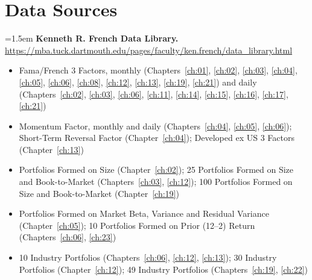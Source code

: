 \chapter*{Data Sources}
\label{datasources}


\begingroup
\small
\sloppy
\setlength{\parindent}{0pt}
\setlength{\parskip}{4pt}

\hangindent=1.5em \textbf{Kenneth R. French Data Library.} \url{https://mba.tuck.dartmouth.edu/pages/faculty/ken.french/data_library.html}
\begin{itemize}\setlength{\itemsep}{0pt}\setlength{\parskip}{0pt}
  \item Fama/French 3 Factors, monthly (Chapters~\ref{ch:01}, \ref{ch:02}, \ref{ch:03}, \ref{ch:04}, \ref{ch:05}, \ref{ch:06}, \ref{ch:08}, \ref{ch:12}, \ref{ch:13}, \ref{ch:19}, \ref{ch:21}) and daily (Chapters~\ref{ch:02}, \ref{ch:03}, \ref{ch:06}, \ref{ch:11}, \ref{ch:14}, \ref{ch:15}, \ref{ch:16}, \ref{ch:17}, \ref{ch:21})
  \item Momentum Factor, monthly and daily (Chapters~\ref{ch:04}, \ref{ch:05}, \ref{ch:06}); Short-Term Reversal Factor (Chapter~\ref{ch:04}); Developed ex US 3 Factors (Chapter~\ref{ch:13})
  \item Portfolios Formed on Size (Chapter~\ref{ch:02}); 25 Portfolios Formed on Size and Book-to-Market (Chapters~\ref{ch:03}, \ref{ch:12}); 100 Portfolios Formed on Size and Book-to-Market (Chapter~\ref{ch:19})
  \item Portfolios Formed on Market Beta, Variance and Residual Variance (Chapter~\ref{ch:05}); 10 Portfolios Formed on Prior (12--2) Return (Chapters~\ref{ch:06}, \ref{ch:23})
  \item 10 Industry Portfolios (Chapters~\ref{ch:06}, \ref{ch:12}, \ref{ch:13}); 30 Industry Portfolios (Chapter~\ref{ch:12}); 49 Industry Portfolios (Chapters~\ref{ch:19}, \ref{ch:22})
\end{itemize}

